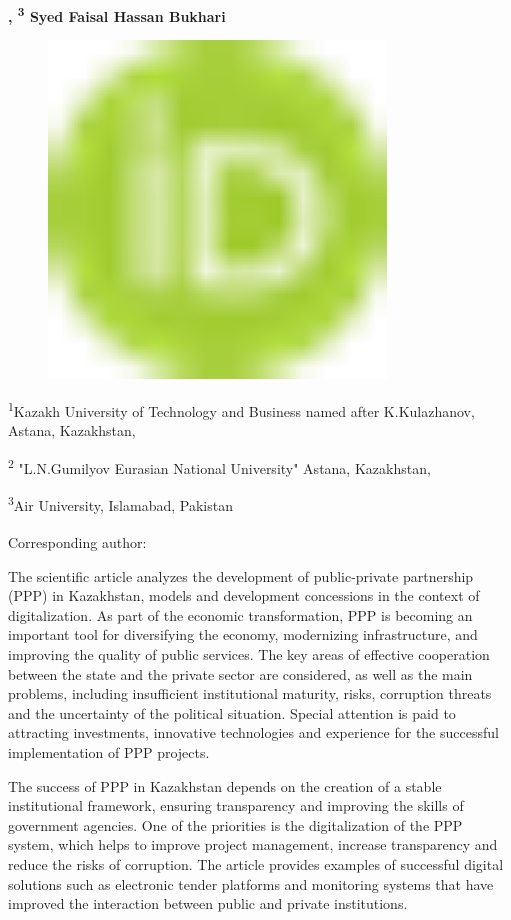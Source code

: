 {\bfseries ,
\textsuperscript{3} Syed Faisal Hassan
Bukhari}
\begin{figure}[H]
	\centering
	\includegraphics[width=0.8\textwidth]{media/ekon2/image1}
	\caption*{}
\end{figure}


\textsuperscript{1}Kazakh University of Technology and Business named
after K.Kulazhanov, Astana, Kazakhstan,

\textsuperscript{2} "L.N.Gumilyov Eurasian National University" Astana,
Kazakhstan,

\textsuperscript{3}Air University, Islamabad, Pakistan

{\bfseries \textsuperscript{\envelope }}Corresponding author:
\href{mailto:maral2804@mail.ru}{}

The scientific article analyzes the development of public-private
partnership (PPP) in Kazakhstan, models and development concessions in
the context of digitalization. As part of the economic transformation,
PPP is becoming an important tool for diversifying the economy,
modernizing infrastructure, and improving the quality of public
services. The key areas of effective cooperation between the state and
the private sector are considered, as well as the main problems,
including insufficient institutional maturity, risks, corruption threats
and the uncertainty of the political situation. Special attention is
paid to attracting investments, innovative technologies and experience
for the successful implementation of PPP projects.

The success of PPP in Kazakhstan depends on the creation of a stable
institutional framework, ensuring transparency and improving the skills
of government agencies. One of the priorities is the digitalization of
the PPP system, which helps to improve project management, increase
transparency and reduce the risks of corruption. The article provides
examples of successful digital solutions such as electronic tender
platforms and monitoring systems that have improved the interaction
between public and private institutions.

